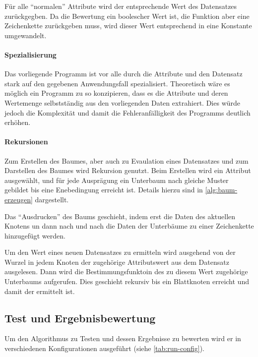 

Für alle \enquote{normalen} Attribute wird der entsprechende Wert des Datensatzes zurückgegben.
Da die Bewertung ein boolescher Wert ist, die Funktion aber eine Zeichenkette zurückgeben muss,
wird dieser Wert entsprechend in eine Konstante umgewandelt.

\paragraph{Spezialisierung}
Das vorliegende Programm ist vor alle durch die Attribute und den Datensatz stark auf den gegebenen Anwendungsfall spezialisiert.
Theoretisch wäre es möglich ein Programm zu so konzipieren, dass es die Attribute und deren Wertemenge selbstständig aus den vorliegenden Daten extrahiert.
Dies würde jedoch die Komplexität und damit die Fehleranfälligkeit des Programms deutlich erhöhen.

\paragraph{Rekursionen}
Zum Erstellen des Baumes, aber auch zu Evaulation eines Datensatzes und zum Darstellen des Baumes wird Rekursion genutzt.
Beim Erstellen wird ein Attribut ausgewählt, und für jede Ausprägung ein Unterbaum nach gleiche Muster gebildet bis eine Enebedingung erreicht ist.
Details hierzu sind in \autoref{alg:baum-erzeugen} dargestellt.

Das \enquote{Ausdrucken} des Baums geschieht,
indem erst die Daten des aktuellen Knotens un
dann nach und nach die Daten der Unterbäume zu einer Zeichenkette hinzugefügt werden.

Um den Wert eines neuen Datensatzes zu ermitteln wird ausgehend von der Wurzel in jedem Knoten der zugehörige Attributswert aus dem Datensatz ausgelesen.
Dann wird die Bestimmungsfunktoin des zu diesem Wert zugehörige Unterbaums aufgerufen.
Dies geschieht rekursiv bis ein Blattknoten erreicht und damit der ermittelt ist.

\subsection{Test und Ergebnisbewertung}
Um den Algorithmus zu Testen und dessen Ergebnisse zu bewerten wird er in verschiedenen Konfigurationen ausgeführt (siehe \autoref{tab:run-config}).


